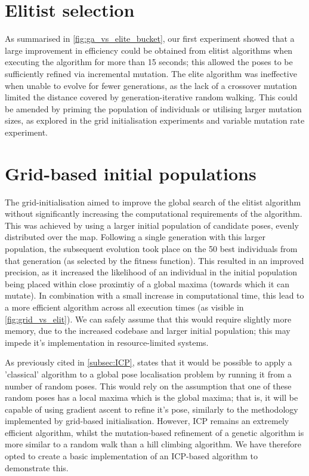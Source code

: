 \documentclass[authoryearcitations]{UoYCSproject}
\begin{document}
\section{Elitist selection}
As summarised in \autoref{fig:ga_vs_elite_bucket}, our first experiment showed that a large improvement in efficiency could be obtained from elitist algorithms when executing the algorithm for more than 15 seconds; this allowed the poses to be sufficiently refined via incremental mutation. The elite algorithm was ineffective when unable to evolve for fewer generations, as the lack of a crossover mutation limited the distance covered by generation-iterative random walking. This could be amended by priming the population of individuals or utilising larger mutation sizes, as explored in the grid initialisation experiments and variable mutation rate experiment.

\section{Grid-based initial populations}
The grid-initialisation aimed to improve the global search of the elitist algorithm without significantly increasing the computational requirements of the algorithm. This was achieved by using a larger initial population of candidate poses, evenly distributed over the map. Following a single generation with this larger population, the subsequent evolution took place on the 50 best individuals from that generation (as selected by the fitness function). This resulted in an improved precision, as it increased the likelihood of an individual in the initial population being placed within close proximtiy of a global maxima (towards which it can mutate). In combination with a small increase in computational time, this lead to a more efficient algorithm across all execution times (as visible in \autoref{fig:grid_vs_elit}). We can safely assume that this would require slightly more memory, due to the increased codebase and larger initial population; this may impede it's implementation in resource-limited systems. 

As previously cited in \autoref{subsec:ICP}, \citet{Censi2005-iv} states that it would be possible to apply a 'classical' algorithm to a global pose localisation problem by running it from a number of random poses. This would rely on the assumption that one of these random poses has a local maxima which is the global maxima; that is, it will be capable of using gradient ascent to refine it's pose, similarly to the methodology implemented by grid-based initialisation. However, ICP remains an extremely efficient algorithm, whilst the mutation-based refinement of a genetic algorithm is more similar to a random walk than a hill climbing algorithm. We have therefore opted to create a basic implementation of an ICP-based algorithm to demonstrate this.
\end{document}

